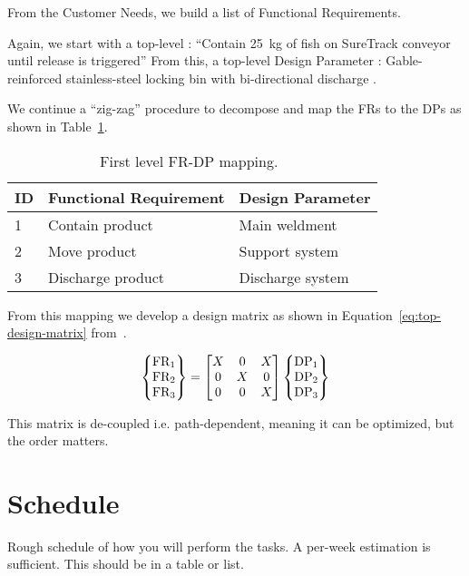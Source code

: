 \documentclass[draft]{rureport}
\begin{document}
From the Customer Needs, we build a list of Functional Requirements.

Again, we start with a top-level : ``Contain \SI{25}{\kilogram} of fish on SureTrack conveyor until release is triggered''
From this, a top-level Design Parameter : Gable-reinforced stainless-steel locking bin with bi-directional discharge
\cite{gerhard2016suretrack}.

We continue a ``zig-zag'' procedure to decompose and map the FRs to the DPs as shown in Table~\ref{tab:first_level-frdp}.

\begin{table}
  \center
  \caption{First level FR-DP mapping.~\cite{gerhard2016suretrack}}\label{tab:first_level-frdp}
  \begin{tabular}{lll} \toprule
    ID& Functional Requirement & Design Parameter \\ \midrule 
    1&Contain product&Main weldment\\
    2&Move product&Support system\\
    3&Discharge product &Discharge system\\
    \bottomrule
  \end{tabular}
\end{table}

From this mapping we develop a design matrix as shown in Equation~\ref{eq:top-design-matrix} from~\cite{gerhard2016suretrack}.

\begin{equation}\label{eq:top-design-matrix}
\begin{Bmatrix}
\text{FR}_{1}\\
\text{FR}_{2}\\
\text{FR}_{3}
\end{Bmatrix}=
\begin{bmatrix}
X &  0 & X\\
0 &  X & 0\\
0 &  0 & X
\end{bmatrix}
\begin{Bmatrix}
\text{DP}_{1}\\
\text{DP}_{2}\\
\text{DP}_{3}
\end{Bmatrix}
\end{equation}

This matrix is de-coupled i.e. path-dependent, meaning it can be optimized, but the order matters.

\section{Schedule}
Rough schedule of how you will perform the tasks.
A per-week estimation is sufficient.
This should be in a table or list.
\end{document}
